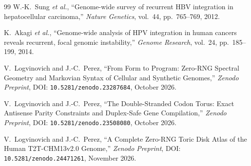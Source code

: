 \documentclass[11pt, a4paper]{article}
\DeclareRobustCommand{\_}{\textunderscore\allowbreak}
\begin{document}
\begin{thebibliography}{99}
W.-K.~Sung \textit{et al.},
``Genome-wide survey of recurrent HBV integration in hepatocellular carcinoma,''
\textit{Nature Genetics}, vol.~44, pp.~765--769, 2012.

K.~Akagi \textit{et al.},
``Genome-wide analysis of HPV integration in human cancers reveals recurrent, focal genomic instability,''
\textit{Genome Research}, vol.~24, pp.~185--199, 2014.

V.~Logvinovich and J.-C.~Perez,
``From Form to Program: Zero-RNG Spectral Geometry and Markovian Syntax of Cellular and Synthetic Genomes,''
\textit{Zenodo Preprint}, DOI: \texttt{10.5281/zenodo.23287684}, October 2026.

V.~Logvinovich and J.-C.~Perez,
``The Double-Stranded Codon Torus: Exact Antisense Parity Constraints and Duplex-Safe Gene Compilation,''
\textit{Zenodo Preprint}, DOI: \texttt{10.5281/zenodo.23508080}, October 2026.

V.~Logvinovich and J.-C.~Perez,
``A Complete Zero-RNG Toric Disk Atlas of the Human T2T-CHM13v2.0 Genome,''
\textit{Zenodo Preprint}, DOI: \texttt{10.5281/zenodo.24471261}, November 2026.

\end{thebibliography}




\end{document}
